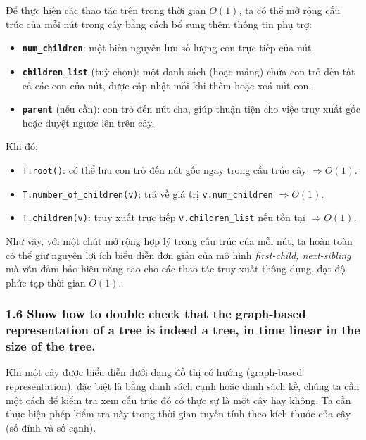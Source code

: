 \documentclass{article}
\begin{document}
	\vspace{0.5em}
	
	Để thực hiện các thao tác trên trong thời gian $O(1)$, ta có thể mở rộng cấu trúc của mỗi nút trong cây bằng cách bổ sung thêm thông tin phụ trợ:
	
	\begin{itemize}
		\item \textbf{\texttt{num\_children}}: một biến nguyên lưu số lượng con trực tiếp của nút.
		\item \textbf{\texttt{children\_list}} (tuỳ chọn): một danh sách (hoặc mảng) chứa con trỏ đến tất cả các con của nút, được cập nhật mỗi khi thêm hoặc xoá nút con.
		\item \textbf{\texttt{parent}} (nếu cần): con trỏ đến nút cha, giúp thuận tiện cho việc truy xuất gốc hoặc duyệt ngược lên trên cây.
	\end{itemize}
	
	Khi đó:
	
	\begin{itemize}
		\item \texttt{T.root()}: có thể lưu con trỏ đến nút gốc ngay trong cấu trúc cây $\Rightarrow O(1)$.
		\item \texttt{T.number\_of\_children(v)}: trả về giá trị \texttt{v.num\_children} $\Rightarrow O(1)$.
		\item \texttt{T.children(v)}: truy xuất trực tiếp \texttt{v.children\_list} nếu tồn tại $\Rightarrow O(1)$.
	\end{itemize}
	
	\vspace{0.5em}
	Như vậy, với một chút mở rộng hợp lý trong cấu trúc của mỗi nút, ta hoàn toàn có thể giữ nguyên lợi ích biểu diễn đơn giản của mô hình \textit{first-child, next-sibling} mà vẫn đảm bảo hiệu năng cao cho các thao tác truy xuất thông dụng, đạt độ phức tạp thời gian $O(1)$.
	
	\subsubsection*{1.6 Show how to double check that the graph-based representation of a tree is indeed a tree, in time linear in the size of the tree.}
	
	Khi một cây được biểu diễn dưới dạng đồ thị có hướng (graph-based representation), đặc biệt là bằng danh sách cạnh hoặc danh sách kề, chúng ta cần một cách để kiểm tra xem cấu trúc đó có thực sự là một cây hay không. Ta cần thực hiện phép kiểm tra này trong thời gian tuyến tính theo kích thước của cây (số đỉnh và số cạnh).
	
\end{document}
